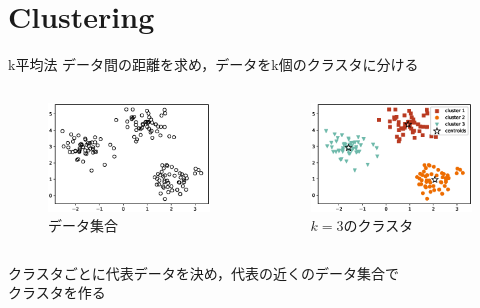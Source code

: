 \documentclass[dvipdfmx,platex]{beamer}
\begin{document}
\section{Clustering}
\begin{frame}{{\mgfamily k平均法}}
  データ間の距離を求め，データをk個のクラスタに分ける
  \begin{columns}[T,onlytextwidth]
    \begin{figure}
      \centering
      \includegraphics[width=5cm]{fig/cluster.eps}
      \caption{{\mgfamily データ集合}}
    \end{figure}
    \begin{figure}
      \centering
      \includegraphics[width=5cm]{fig/colored_scatter.eps}
      \caption{$k=3${\mgfamily のクラスタ}}
    \end{figure}
  \end{columns}
  クラスタごとに代表データを決め，代表の近くのデータ集合で\\クラスタを作る
\end{frame}
\end{document}

